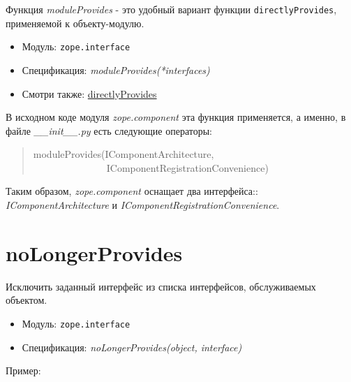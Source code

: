 \documentclass[a4paper,openany,twoside,final]{book}
\providecommand*{\DUroletitlereference}[1]{\textsl{#1}}
\begin{document}
Функция \DUroletitlereference{moduleProvides} - это удобный вариант функции
\texttt{directlyProvides}, применяемой к объекту-модулю.

\begin{itemize}

\item Модуль: \texttt{zope.interface}

\item Спецификация: \DUroletitlereference{moduleProvides(*interfaces)}

\item Смотри также: \hyperref[directlyprovides]{directlyProvides}

\end{itemize}

В исходном коде модуля \DUroletitlereference{zope.component} эта функция применяется, а
именно, в файле \DUroletitlereference{\_\_init\_\_.py} есть следующие операторы:

\begin{quote}{\ttfamily \raggedright \noindent
moduleProvides(IComponentArchitecture,\\
~~~~~~~~~~~~~~~IComponentRegistrationConvenience)
}
\end{quote}

Таким образом, \DUroletitlereference{zope.component} оснащает два интерфейса::
\DUroletitlereference{IComponentArchitecture} и \DUroletitlereference{IComponentRegistrationConvenience}.


\section*{noLongerProvides%
  \label{nolongerprovides}%
}

Исключить заданный интерфейс из списка интерфейсов, обслуживаемых
объектом.

\begin{itemize}

\item Модуль: \texttt{zope.interface}

\item Спецификация: \DUroletitlereference{noLongerProvides(object, interface)}

\end{itemize}

Пример:
\end{document}
